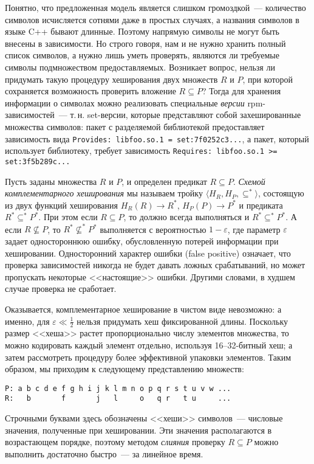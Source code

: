 \documentclass[russian,a4paper,12pt,titlepage]{article}
\begin{document}
Понятно, что предложенная модель является слишком громоздкой~--- количество символов исчисляется сотнями даже в простых случаях,
а названия символов в языке C++ бывают длинные.  Поэтому напрямую символы не могут быть внесены в зависимости.
Но строго говоря, нам и не нужно хранить полный список символов, а нужно лишь уметь проверять, являются ли требуемые
символы подмножеством предоставляемых.  Возникает вопрос, нельзя ли придумать такую процедуру хеширования двух
множеств $R$ и $P$, при которой сохраняется возможность проверить вложение $R\subseteq P$?
Тогда для хранения информации о символах можно реализовать
специальные \emph{версии} rpm-зависимостей~--- т.\,н. set-версии, которые представляют собой захешированные множества символов:
пакет с разделяемой библиотекой предоставляет зависимость вида \verb|Provides: libfoo.so.1 = set:7f0252c3...|,
а пакет, который использует библиотеку, требует зависимость \verb|Requires: libfoo.so.1 >= set:3f5b289c...|

Пусть заданы множества $R$ и $P$, и определен предикат $R\subseteq P$.
\emph{Схемой комплементарного хеширования} мы называем тройку $\langle H_R, H_P, \subseteq^*\rangle$,
состоящую из двух функций хеширования $H_R(R)\to R^*$, $H_P(P)\to P^*$ и
предиката $R^*\subseteq^*P^*$.  При этом если $R\subseteq P$, то должно всегда
выполняться и $R^*\subseteq^*P^*$. А если $R\not\subseteq P$, то $R^*\not\subseteq^*P^*$
выполняется с вероятностью $1-\varepsilon$, где параметр $\varepsilon$ задает одностороннюю ошибку,
обусловленную потерей информации при хешировании.  Односторонний характер ошибки (false positive) означает,
что проверка зависимостей никогда не будет давать ложных срабатываний, но может пропускать некоторые <<настоящие>> ошибки.
Другими словами, в худшем случае проверка не сработает.

Оказывается, комплементарное хеширование в чистом виде невозможно: а именно,
для $\varepsilon\ll\frac{1}{2}$ нельзя придумать хеш фиксированной длины.
Поскольку размер <<хеша>> растет пропорционально числу элементов множества,
то можно кодировать каждый элемент отдельно, используя 16--32-битный хеш;
а затем рассмотреть процедуру более эффективной упаковки элементов.
Таким образом, мы приходим к следующему представлению множеств:
\begin{verbatim}
P: a b c d e f g h i j k l m n o p q r s t u v w ...
R:   b       f       j   l     o   q r   t u     ...
\end{verbatim}
Строчными буквами здесь обозначены <<хеши>> символов~--- числовые значения, полученные при хешировании.
Эти значения располагаются в возрастающем порядке, поэтому методом \emph{слияния} проверку $R\subseteq P$
можно выполнить достаточно быстро~--- за линейное время.
\end{document}
